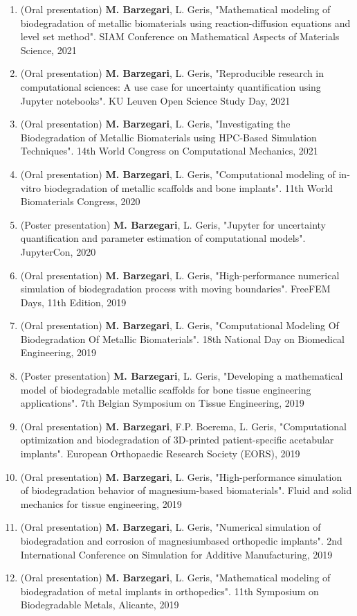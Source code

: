 \documentclass{cv}
\begin{document}
\begin{enumerate}[itemsep=-0.2ex]
(Oral presentation)
\textbf{M. Barzegari}, D. Mei, S.V. Lamaka, L. Geris, "Mathematical modeling of degradation process of biodegradable metallic biomaterials in immersion and perfusion setups". XXVIII Congress of the International Society of Biomechanics (ISB), 2021
\item
(Oral presentation)
\textbf{M. Barzegari}, L. Geris, "Mathematical modeling of biodegradation of metallic biomaterials using reaction-diffusion equations and level set method". SIAM Conference on Mathematical Aspects of Materials Science, 2021
\item
(Oral presentation)
\textbf{M. Barzegari}, L. Geris, "Reproducible research in computational sciences: A use case for uncertainty quantification using Jupyter notebooks". KU Leuven Open Science Study Day, 2021
\item
(Oral presentation)
\textbf{M. Barzegari}, L. Geris, "Investigating the Biodegradation of Metallic Biomaterials using HPC-Based Simulation Techniques". 14th World Congress on Computational Mechanics, 2021
\item
(Oral presentation) 
\textbf{M. Barzegari}, L. Geris, "Computational modeling of in-vitro biodegradation of metallic scaffolds and bone implants". 11th World Biomaterials Congress, 2020
\item
(Poster presentation) 
\textbf{M. Barzegari}, L. Geris, "Jupyter for uncertainty quantification and parameter estimation of computational models". JupyterCon, 2020
\item
(Oral presentation) 
\textbf{M. Barzegari}, L. Geris, "High-performance numerical simulation of biodegradation process with moving boundaries". FreeFEM Days, 11th Edition, 2019
\item
(Oral presentation) 
\textbf{M. Barzegari}, L. Geris, "Computational Modeling Of Biodegradation Of Metallic Biomaterials". 18th National Day on Biomedical Engineering, 2019
\item
(Poster presentation) 
\textbf{M. Barzegari}, L. Geris, "Developing a mathematical model of biodegradable metallic scaffolds for bone tissue engineering applications". 7th Belgian Symposium on Tissue Engineering, 2019
\item
(Oral presentation) 
\textbf{M. Barzegari}, F.P. Boerema, L. Geris, "Computational optimization and biodegradation of 3D-printed patient-specific acetabular implants". European Orthopaedic Research Society (EORS), 2019
\item
(Oral presentation) 
\textbf{M. Barzegari}, L. Geris, "High-performance simulation of biodegradation behavior of magnesium-based biomaterials". Fluid and solid mechanics for tissue engineering, 2019
\item
(Oral presentation) 
\textbf{M. Barzegari}, L. Geris, "Numerical simulation of biodegradation and corrosion of magnesiumbased orthopedic implants". 2nd International Conference on Simulation for Additive Manufacturing, 2019
\item
(Oral presentation) 
\textbf{M. Barzegari}, L. Geris, "Mathematical modeling of biodegradation of metal implants in orthopedics". 11th Symposium on Biodegradable Metals, Alicante, 2019
\end{enumerate}
\end{document}

